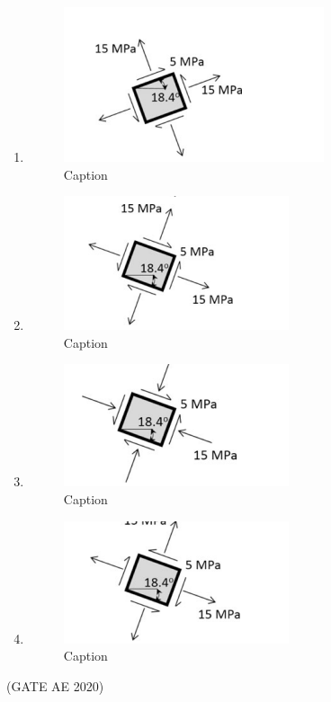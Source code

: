 \documentclass[journal,12pt,onecolumn]{IEEEtran}
\theoremstyle{remark}
\begin{document}
\begin{enumerate}
\begin{enumerate}
  

\item 
\begin{figure}[H]
    \centering
    \includegraphics[width=0.5\columnwidth]{figs/Screenshot from 2025-08-19 15-42-35.png}
    \caption{Caption}
    \label{fig:placeholder}
\end{figure}
\item 
\begin{figure}[H]
    \centering
    \includegraphics[width=0.5\columnwidth]{figs/Screenshot from 2025-08-19 15-44-14.png}
    \caption{Caption}
    \label{fig:placeholder}
\end{figure}
 \item 
 \begin{figure}[H]
     \centering
     \includegraphics[width=0.5\columnwidth]{figs/Screenshot from 2025-08-19 15-45-13.png}
     \caption{Caption}
     \label{fig:placeholder}
 \end{figure}
 \item 
 \begin{figure}[H]
     \centering
     \includegraphics[width=0.5\columnwidth]{figs/Screenshot from 2025-08-19 15-46-00.png}
     \caption{Caption}
     \label{fig:placeholder}
 \end{figure}
\end{enumerate}
\hfill(GATE AE 2020)



\end{enumerate}
\end{document}
